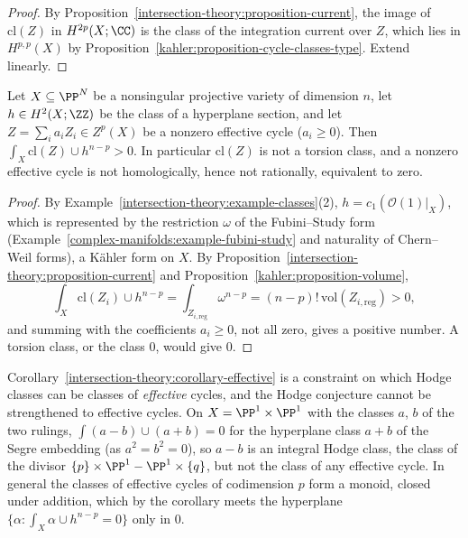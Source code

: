 \begin{proof}
By Proposition~\ref{intersection-theory:proposition-current}, the image of $\mathrm{cl}(Z)$ in $H^{2p}(X; \CC)$ is the class of the integration current over $Z$, which lies in $H^{p,p}(X)$ by
Proposition~\ref{kahler:proposition-cycle-classes-type}. Extend linearly.
\end{proof}

\begin{corollary}\label{intersection-theory:corollary-effective}
Let $X \subseteq \PP^N$ be a nonsingular projective variety of dimension $n$, let $h \in H^2(X; \ZZ)$ be the class of a hyperplane section, and let $Z = \sum_ia_iZ_i \in Z^p(X)$ be a nonzero effective cycle
($a_i \geq 0$). Then $\int_X\mathrm{cl}(Z) \cup h^{n-p} > 0$. In particular $\mathrm{cl}(Z)$ is not a torsion class, and a nonzero effective cycle is not homologically, hence not rationally, equivalent to zero.
\end{corollary}

\begin{proof}
By Example~\ref{intersection-theory:example-classes}(2), $h = c_1(\mathcal{O}(1)|_X)$, which is represented by the restriction $\omega$ of the Fubini--Study form (Example~\ref{complex-manifolds:example-fubini-study}
and naturality of Chern--Weil forms), a K\"ahler form on $X$. By Proposition~\ref{intersection-theory:proposition-current} and Proposition~\ref{kahler:proposition-volume},
\[
\int_X\mathrm{cl}(Z_i) \cup h^{n-p} = \int_{Z_{i,\mathrm{reg}}}\omega^{n-p} = (n-p)!\,\mathrm{vol}(Z_{i,\mathrm{reg}}) > 0,
\]
and summing with the coefficients $a_i \geq 0$, not all zero, gives a positive number. A torsion class, or the class $0$, would give $0$.
\end{proof}

\begin{counterexample}\label{intersection-theory:counterexample-not-effective}
Corollary~\ref{intersection-theory:corollary-effective} is a constraint on which Hodge classes can be classes of \emph{effective} cycles, and the Hodge conjecture cannot be strengthened to effective
cycles. On $X = \PP^1 \times \PP^1$ with the classes $a$, $b$ of the two rulings, $\int(a - b) \cup (a + b) = 0$ for the hyperplane class $a + b$ of the Segre embedding (as $a^2 = b^2 = 0$), so $a - b$ is an
integral Hodge class, the class of the divisor $\{p\} \times \PP^1 - \PP^1 \times \{q\}$, but not the class of any effective cycle. In general the classes of effective cycles of codimension $p$ form a monoid, closed under addition, which by the corollary meets the hyperplane
$\{\alpha : \int_X\alpha \cup h^{n-p} = 0\}$ only in $0$.
\end{counterexample}

